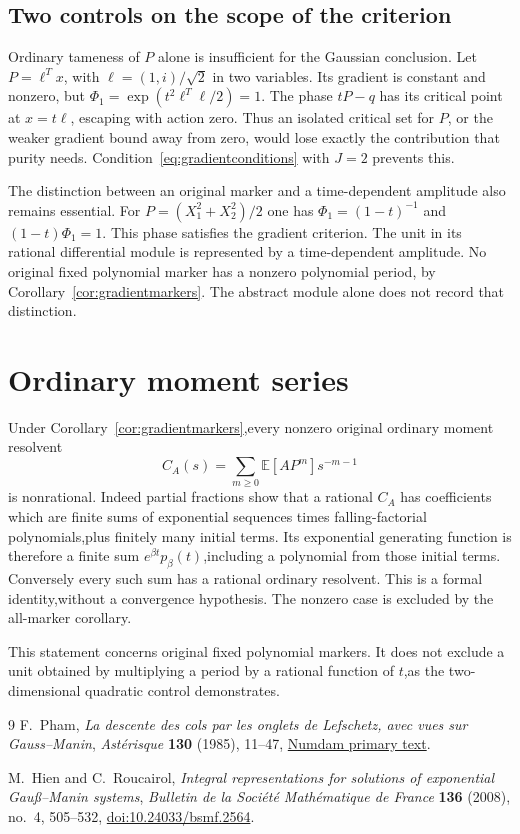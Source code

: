 \documentclass[11pt]{article}
\theoremstyle{definition}\newtheorem{definition}[theorem]{Definition}
\theoremstyle{remark}\newtheorem{remark}[theorem]{Remark}
\newcommand{\E}{\mathbb E}
\begin{document}
\subsection{Two controls on the scope of the criterion}

Ordinary tameness of $P$ alone is insufficient for the Gaussian
conclusion. Let $P=\ell^Tx$, with $\ell=(1,i)/\sqrt2$ in two
variables. Its gradient is constant and nonzero, but
$\Phi_1=\exp(t^2\ell^T\ell/2)=1$. The phase $tP-q$ has its
critical point at $x=t\ell$, escaping with action zero. Thus an
isolated critical set for $P$, or the weaker gradient bound away
from zero, would lose exactly the contribution that purity needs.
Condition~\eqref{eq:gradientconditions} with $J=2$ prevents this.

The distinction between an original marker and a time-dependent
amplitude also remains essential. For
$P=(X_1^2+X_2^2)/2$ one has $\Phi_1=(1-t)^{-1}$ and
$(1-t)\Phi_1=1$. This phase satisfies the gradient criterion.
The unit in its rational differential module is represented by a
time-dependent amplitude. No original fixed polynomial marker has
a nonzero polynomial period, by Corollary~\ref{cor:gradientmarkers}.
The abstract module alone does not record that distinction.

\section{Ordinary moment series}
Under Corollary~\ref{cor:gradientmarkers},every nonzero original
ordinary moment resolvent
\[
 C_A(s)=\sum_{m\geq0}\E[AP^m]s^{-m-1}
\]
is nonrational. Indeed partial fractions show that a rational $C_A$
has coefficients which are finite sums of exponential sequences
times falling-factorial polynomials,plus finitely many initial terms.
Its exponential generating function is therefore a finite sum
$e^{\beta t}p_\beta(t)$,including a polynomial from those initial terms.
Conversely every such sum has a rational ordinary resolvent. This is a
formal identity,without a convergence hypothesis. The nonzero case is
excluded by the all-marker corollary.

This statement concerns original fixed polynomial markers. It does not
exclude a unit obtained by multiplying a period by a rational function
of $t$,as the two-dimensional quadratic control demonstrates.
\begin{thebibliography}{9}
F.~Pham, \emph{La descente des cols par les onglets de Lefschetz,
avec vues sur Gauss--Manin}, \emph{Ast\'erisque} \textbf{130}
(1985), 11--47,
\href{https://numdam.org/item/AST_1985__130__11_0/}{Numdam primary text}.

M.~Hien and C.~Roucairol, \emph{Integral representations for solutions
of exponential Gau\ss--Manin systems},
\emph{Bulletin de la Soci\'et\'e Math\'ematique de France}
\textbf{136} (2008), no.~4, 505--532,
\href{https://doi.org/10.24033/bsmf.2564}{doi:10.24033/bsmf.2564}.

\end{thebibliography}
\end{document}
